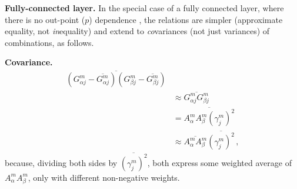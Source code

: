 \documentclass{article} %
\begin{document}
{\bf Fully-connected layer.} In the special case of a fully connected layer, where there is no out-point ($p$) dependence , the relations are simpler (approximate equality, not {\it in}equality) and extend to {\it co}variances (not just variances) of combinations, as follows.

{\bf Covariance.}
\begin{equation}
    \begin{split}
    \overline{\left(G^m_{\alpha j} - \overline{G^m_{\alpha j}}\right) \left(G^m_{\beta j} - \overline{G^m_{\beta j}}\right)} & \\
     & \approx \overline{G^m_{\alpha j} G^m_{\beta j}} \\
     & = \overline{A^m_{\alpha} A^m_{\beta} \left(\gamma^m_j\right)^2} \\
     & \approx \overline{A^m_{\alpha} A^m_{\beta}} \overline{\left(\gamma^m_j\right)^2}\,,
    \end{split}
    \label{g_cov}
\end{equation}
because, dividing both sides by $\overline{\left(\gamma^m_j\right)^2}$, both express some weighted average of $A^m_{\alpha} A^m_{\beta}$, only with different non-negative weights.

%



\end{document}

